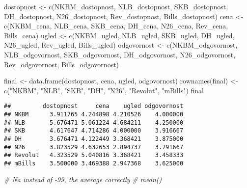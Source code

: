 \documentclass[
]{article}
\newenvironment{Shaded}{\begin{snugshade}}{\end{snugshade}}
\newcommand{\CommentTok}[1]{\textcolor[rgb]{0.56,0.35,0.01}{\textit{#1}}}
\newcommand{\FunctionTok}[1]{\textcolor[rgb]{0.00,0.00,0.00}{#1}}
\newcommand{\NormalTok}[1]{#1}
\newcommand{\OtherTok}[1]{\textcolor[rgb]{0.56,0.35,0.01}{#1}}
\newcommand{\StringTok}[1]{\textcolor[rgb]{0.31,0.60,0.02}{#1}}
\begin{document}
\begin{Shaded}
\begin{Highlighting}[]
\NormalTok{dostopnost }\OtherTok{\textless{}{-}} \FunctionTok{c}\NormalTok{(NKBM\_dostopnost, NLB\_dostopnost, SKB\_dostopnost, DH\_dostopnost, N26\_dostopnost, Rev\_dostopnost, Bills\_dostopnost)}
\NormalTok{cena }\OtherTok{\textless{}{-}} \FunctionTok{c}\NormalTok{(NKBM\_cena, NLB\_cena, SKB\_cena, DH\_cena, N26\_cena, Rev\_cena, Bills\_cena)}
\NormalTok{ugled }\OtherTok{\textless{}{-}} \FunctionTok{c}\NormalTok{(NKBM\_ugled, NLB\_ugled, SKB\_ugled, DH\_ugled, N26\_ugled, Rev\_ugled, Bills\_ugled)}
\NormalTok{odgovornost }\OtherTok{\textless{}{-}} \FunctionTok{c}\NormalTok{(NKBM\_odgovornost, NLB\_odgovornost, SKB\_odgovornost, DH\_odgovornost, N26\_odgovornost, Rev\_odgovornost, Bills\_odgovornost)}


\NormalTok{final }\OtherTok{\textless{}{-}} \FunctionTok{data.frame}\NormalTok{(dostopnost, cena, ugled, odgovornost)}
\FunctionTok{rownames}\NormalTok{(final) }\OtherTok{\textless{}{-}} \FunctionTok{c}\NormalTok{(}\StringTok{"NKBM"}\NormalTok{, }\StringTok{"NLB"}\NormalTok{, }\StringTok{"SKB"}\NormalTok{, }\StringTok{"DH"}\NormalTok{, }\StringTok{"N26"}\NormalTok{, }\StringTok{"Revolut"}\NormalTok{, }\StringTok{"mBills"}\NormalTok{)}
\NormalTok{final}
\end{Highlighting}
\end{Shaded}

\begin{verbatim}
##         dostopnost     cena    ugled odgovornost
## NKBM      3.911765 4.244898 4.210526    4.000000
## NLB       5.676471 5.061224 4.684211    4.250000
## SKB       4.617647 4.714286 4.000000    3.916667
## DH        3.676471 4.122449 3.368421    3.875000
## N26       3.823529 4.632653 2.894737    3.791667
## Revolut   4.323529 5.040816 3.368421    3.458333
## mBills    3.500000 3.469388 2.947368    3.625000
\end{verbatim}

\begin{Shaded}
\begin{Highlighting}[]
\CommentTok{\# Na instead of {-}99, the average correctly}
\CommentTok{\# mean()}
\end{Highlighting}
\end{Shaded}
\end{document}
